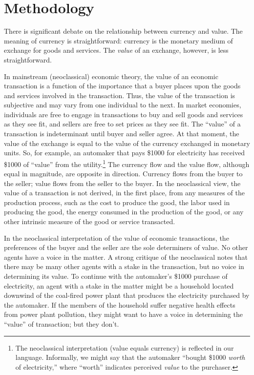 \section{Methodology}

There is significant debate on the relationship between currency and value. 
The meaning of currency is straightforward: currency is the 
monetary medium of exchange for goods and services. 
The \emph{value} of an exchange, however, is less straightforward.

In mainstream (neoclassical) economic theory,
the value of an economic transaction is a function of
the importance that a buyer places upon the goods 
and services involved in the transaction.
Thus, the value of the transaction is subjective and may 
vary from one individual to the next. 
In market economies, individuals are free to engage in transactions to buy
and sell goods and services as they see fit, and sellers are free to set
prices as they see fit. 
The ``value'' of a transaction is indeterminant until buyer and seller agree.
At that moment, the value of the exchange 
is equal to the value of the currency exchanged
in monetary units.
So, for example, an automaker that pays \$1000 for electricity has received
\$1000 of ``value'' from the utility.\footnote{The neoclassical 
interpretation (value equals currency) 
is reflected in our language. 
Informally, we might say that the automaker 
``bought \$1000 \emph{worth} of electricity,'' 
where ``worth'' indicates perceived 
\emph{value} to the purchaser.}
The currency flow and the value flow, 
although equal in magnitude, are opposite in direction. 
Currency flows from the buyer to the seller;
value flows from the seller to the buyer.
In the neoclassical view, the value of a transaction is not derived, 
in the first place, from any measures of the production process,
such as the cost to produce the good, 
the labor used in producing the good,
the energy consumed in the production of the good,
or any other intrinsic measure of the good or service transacted.

In the neoclassical interpretation of the value of economic transactions, 
the preferences of the buyer and the seller are the sole determiners of value. 
No other agents have a voice in the matter. 
A strong critique of the neoclassical notes that
there may be many other agents with a stake in the transaction,
but no voice in determining its value.
To continue with the automaker's \$1000 purchase of electricity,
an agent with a stake in the matter might be
a household located downwind of the coal-fired power plant that produces
the electricity purchased by the automaker.
If the members of the household suffer negative health effects 
from power plant pollution, 
they might want to have a voice in determining the ``value'' of 
transaction; but they don't.

